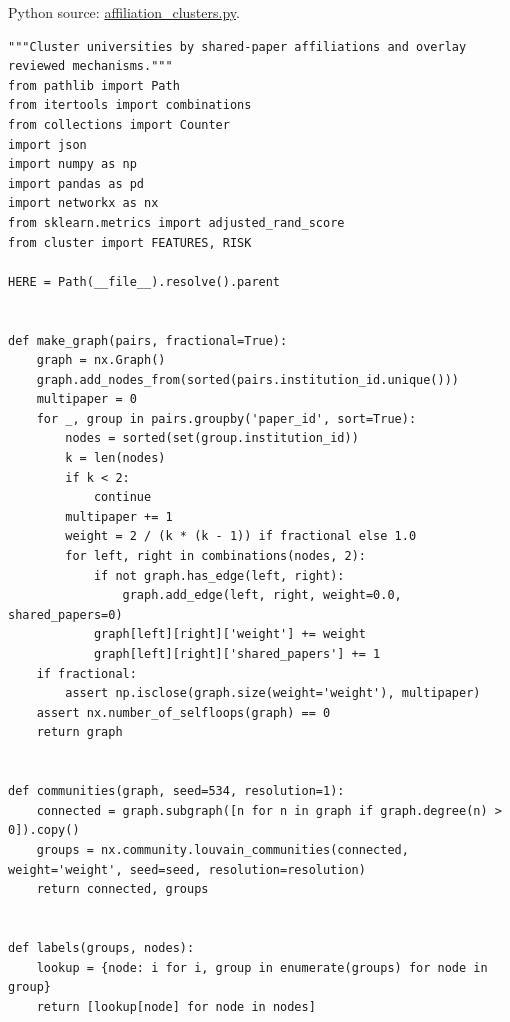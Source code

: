\FloatBarrier
{}
Python source:
\href{../03_Data_and_Code/Consumer_Agency_Literature/affiliation_clusters.py}{affiliation\_clusters.py}.

\begin{Verbatim}[breaklines,breakanywhere,fontsize=\small]
"""Cluster universities by shared-paper affiliations and overlay reviewed mechanisms."""
from pathlib import Path
from itertools import combinations
from collections import Counter
import json
import numpy as np
import pandas as pd
import networkx as nx
from sklearn.metrics import adjusted_rand_score
from cluster import FEATURES, RISK

HERE = Path(__file__).resolve().parent


def make_graph(pairs, fractional=True):
    graph = nx.Graph()
    graph.add_nodes_from(sorted(pairs.institution_id.unique()))
    multipaper = 0
    for _, group in pairs.groupby('paper_id', sort=True):
        nodes = sorted(set(group.institution_id))
        k = len(nodes)
        if k < 2:
            continue
        multipaper += 1
        weight = 2 / (k * (k - 1)) if fractional else 1.0
        for left, right in combinations(nodes, 2):
            if not graph.has_edge(left, right):
                graph.add_edge(left, right, weight=0.0, shared_papers=0)
            graph[left][right]['weight'] += weight
            graph[left][right]['shared_papers'] += 1
    if fractional:
        assert np.isclose(graph.size(weight='weight'), multipaper)
    assert nx.number_of_selfloops(graph) == 0
    return graph


def communities(graph, seed=534, resolution=1):
    connected = graph.subgraph([n for n in graph if graph.degree(n) > 0]).copy()
    groups = nx.community.louvain_communities(connected, weight='weight', seed=seed, resolution=resolution)
    return connected, groups


def labels(groups, nodes):
    lookup = {node: i for i, group in enumerate(groups) for node in group}
    return [lookup[node] for node in nodes]



\end{Verbatim}
